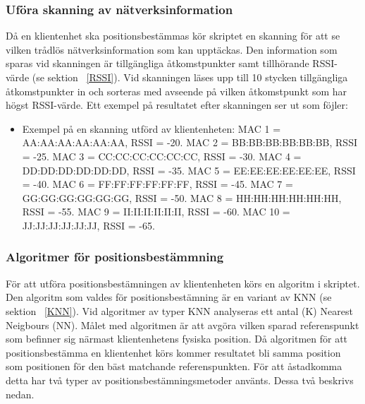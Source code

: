 \documentclass[a4paper,12pt]{article}
\begin{document}
 \subsubsection{Uföra skanning av nätverksinformation} \label{skanning}
 Då en klientenhet ska positionsbestämmas kör skriptet en skanning för att se vilken trådlös nätverksinformation som kan upptäckas. Den information som sparas vid skanningen är tillgängliga åtkomstpunkter samt tillhörande RSSI-värde (se sektion ~\ref{RSSI}). Vid skanningen läses upp till 10 stycken tillgängliga åtkomstpunkter in och sorteras med avseende på vilken åtkomstpunkt som har högst RSSI-värde. Ett exempel på resultatet efter skanningen ser ut som föjler:

   \begin{itemize}
   \item Exempel på en skanning utförd av klientenheten:
         \newline MAC 1 = AA:AA:AA:AA:AA:AA,  RSSI = -20.
         \newline MAC 2 = BB:BB:BB:BB:BB:BB,  RSSI = -25.
         \newline MAC 3 = CC:CC:CC:CC:CC:CC,  RSSI = -30.
         \newline MAC 4 = DD:DD:DD:DD:DD:DD,  RSSI = -35.
         \newline MAC 5 = EE:EE:EE:EE:EE:EE,  RSSI = -40.
         \newline MAC 6 = FF:FF:FF:FF:FF:FF,  RSSI = -45.
         \newline MAC 7 = GG:GG:GG:GG:GG:GG,  RSSI = -50.
         \newline MAC 8 = HH:HH:HH:HH:HH:HH,  RSSI = -55.
         \newline MAC 9 = II:II:II:II:II:II,  RSSI = -60.
         \newline MAC 10 = JJ:JJ:JJ:JJ:JJ:JJ,  RSSI = -65.
   \end{itemize}

 \subsubsection{Algoritmer för positionsbestämmning}\label{algoritm}
 För att utföra positionsbestämningen av klientenheten körs en algoritm i skriptet. Den algoritm som valdes för positionsbestämning är en variant av KNN (se sektion ~\ref{KNN}). Vid algoritmer av typer KNN analyseras ett antal (K) Nearest Neigbours (NN).
 Målet med algoritmen är att avgöra vilken sparad referenspunkt som befinner sig närmast klientenhetens fysiska position. Då algoritmen för att positionsbestämma en klientenhet körs kommer resultatet bli samma position som positionen för den bäst matchande referenspunkten. För att åstadkomma detta har två typer av positionsbestämningsmetoder använts. Dessa två beskrivs nedan.
\end{document}
